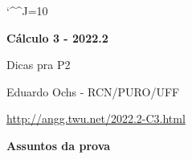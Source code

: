 \documentclass[oneside,12pt]{article}
\begin{document}
\catcode`\^^J=10
\pu
\def\pictgridstyle{\color{GrayPale}\linethickness{0.3pt}}
\def\pictaxesstyle{\linethickness{0.5pt}}
\def\pictnaxesstyle{\color{GrayPale}\linethickness{0.5pt}}
\celllower=2.5pt


\def\u#1{\par{\footnotesize \url{#1}}}

\def\drafturl{http://angg.twu.net/LATEX/2022-2-C3.pdf}
\def\drafturl{http://angg.twu.net/2022.2-C3.html}
\def\draftfooter{\tiny \href{\drafturl}{\jobname{}} \ColorBrown{\shorttoday{} \hours}}



%

\thispagestyle{empty}

\begin{center}

\vspace*{1.2cm}

{\bf \Large Cálculo 3 - 2022.2}

\bsk

Dicas pra P2

\bsk

Eduardo Ochs - RCN/PURO/UFF

\url{http://angg.twu.net/2022.2-C3.html}

\end{center}

\newpage


{\bf Assuntos da prova}
\end{document}
